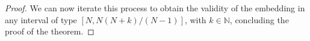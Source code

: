 \documentclass[10pt,a4paper]{amsart}
\begin{document}
\begin{proof}
		We can now iterate this process to obtain the validity of the embedding in any interval 
        of type $\left[N,N(N+k)/(N-1)\right]$,  with $k \in \mathbb{N}$, concluding the 
        proof of the theorem.
	\end{proof}
\end{document}

